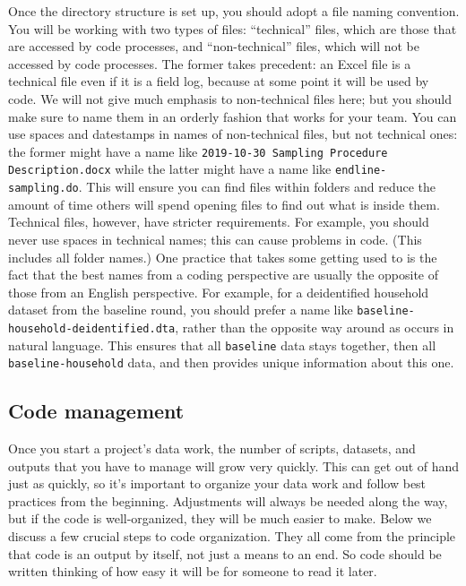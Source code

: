 Once the directory structure is set up,
you should adopt a file naming convention.
You will be working with two types of files:
``technical'' files, which are those that are accessed by code processes,
and ``non-technical'' files, which will not be accessed by code processes.
The former takes precedent: an Excel file is a technical file
even if it is a field log, because at some point it will be used by code.
We will not give much emphasis to non-technical files here;
but you should make sure to name them
in an orderly fashion that works for your team.
You can use spaces and datestamps in names of non-technical files, but not technical ones:
the former might have a name like \texttt{2019-10-30 Sampling Procedure Description.docx}
while the latter might have a name like \texttt{endline-sampling.do}.
This will ensure you can find files within folders
and reduce the amount of time others will spend opening files
to find out what is inside them.
Technical files, however, have stricter requirements.
For example, you should never use spaces in technical names;
this can cause problems in code. (This includes all folder names.)
One practice that takes some getting used to
is the fact that the best names from a coding perspective
are usually the opposite of those from an English perspective.
For example, for a deidentified household dataset from the baseline round,
you should prefer a name like \texttt{baseline-household-deidentified.dta},
rather than the opposite way around as occurs in natural language.
This ensures that all \texttt{baseline} data stays together,
then all \texttt{baseline-household} data,
and then provides unique information about this one.

\subsection{Code management}

Once you start a project's data work,
the number of scripts, datasets, and outputs that you have to manage will grow very quickly.
This can get out of hand just as quickly,
so it's important to organize your data work and follow best practices from the beginning.
Adjustments will always be needed along the way,
but if the code is well-organized, they will be much easier to make.
Below we discuss a few crucial steps to code organization.
They all come from the principle that code is an output by itself,
not just a means to an end.
So code should be written thinking of how easy it will be for someone to read it later.

